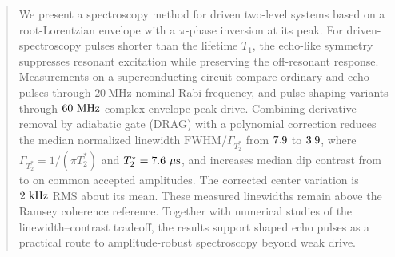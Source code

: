 \begin{abstract}
We present a spectroscopy method for driven two-level systems based on a root-Lorentzian envelope with a $\pi$-phase inversion at its peak. For driven-spectroscopy pulses shorter than the lifetime $T_1$, the echo-like symmetry suppresses resonant excitation while preserving the off-resonant response. Measurements on a superconducting circuit compare ordinary and echo pulses through $20~\mathrm{MHz}$ nominal Rabi frequency, and pulse-shaping variants through $\LatestThreeDisplayMaxRabi~\mathrm{MHz}$ complex-envelope peak drive. Combining derivative removal by adiabatic gate (DRAG) with a polynomial correction reduces the median normalized linewidth $\mathrm{FWHM}/\Gamma_{T_2^*}$ from $\LatestDragWidthNormalized$ to $\LatestPolyWidthNormalized$, where $\Gamma_{T_2^*}=1/(\pi T_2^*)$ and $T_2^*=\PaperTTwoStar~\mu\mathrm{s}$, and increases median dip contrast from \LatestDragContrast{} to \LatestPolyContrast{} on common accepted amplitudes. The corrected center variation is $\LatestPolyCenterRms~\mathrm{kHz}$ RMS about its mean. These measured linewidths remain above the Ramsey coherence reference. Together with numerical studies of the linewidth--contrast tradeoff, the results support shaped echo pulses as a practical route to amplitude-robust spectroscopy beyond weak drive.
\end{abstract}

